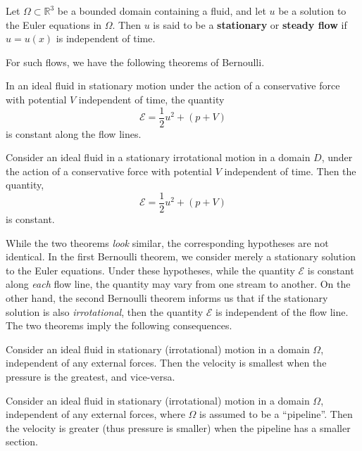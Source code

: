 \documentclass{article}
\begin{document}
\begin{definition}
	Let $\Omega \subset \mathbb{R}^{3}$ be a bounded domain containing a fluid, and let $u$ be a solution to the Euler equations in $\Omega$. Then $u$ is said to be a \textbf{stationary} or \textbf{steady flow} if $u = u(x)$ is independent of time. 
\end{definition} 

For such flows, we have the following theorems of Bernoulli. 

\begin{theorem}[Bernoulli I]
	In an ideal fluid in stationary motion under the action of a conservative force with potential $V$ independent of time, the quantity 
	\begin{equation}
		\mathcal{E} = \frac{1}{2}u^{2} + (p + V)
	\end{equation}
	is constant along the flow lines. 
\end{theorem} 

\begin{theorem}[Bernoulli II]
	Consider an ideal fluid in a stationary irrotational motion in a domain $D$, under the action of a conservative force with potential $V$ independent of time. Then the quantity, 
	\begin{equation}
		\mathcal{E} =\frac{1}{2}u^{2} + (p + V) 
	\end{equation}
	is constant. 
\end{theorem} 

While the two theorems \textit{look} similar, the corresponding hypotheses are not identical. In the first Bernoulli theorem, we consider merely a stationary solution to the Euler equations. Under these hypotheses, while the quantity $\mathcal{E}$ is constant along \textit{each} flow line, the quantity may vary from one stream to another. On the other hand, the second Bernoulli theorem informs us that if the stationary solution is also \textit{irrotational}, then the quantity $\mathcal{E}$ is independent of the flow line. The two theorems imply the following consequences. 

\begin{corollary}
	Consider an ideal fluid in stationary (irrotational) motion in a domain $\Omega$, independent of any external forces. Then the velocity is smallest when the pressure is the greatest, and vice-versa. 
\end{corollary} 
\begin{corollary}[Bernoulli IV]
	Consider an ideal fluid in stationary (irrotational) motion in a domain $\Omega$, independent of any external forces, where $\Omega$ is assumed to be a ``pipeline''. Then the velocity is greater (thus pressure is smaller) when the pipeline has a smaller section. 
\end{corollary} 
\end{document}
